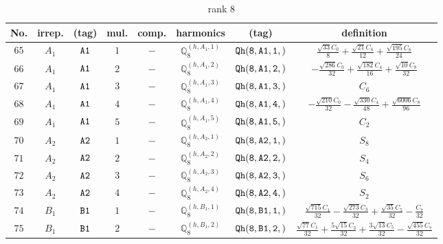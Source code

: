 \documentclass[fleqn,8pt]{jsarticle}
\begin{document}
\begin{table}[ht!]
\begin{center}
\caption{rank 8}
\renewcommand{\arraystretch}{1.3}
\begin{tabular}{cccccccc} \hline \hline
No. & irrep. & (tag) & mul. & comp. & harmonics & (tag) & definition \\ \hline
$ 65 $ & $ A_{1} $ & $ {\tt A1} $ & $ 1 $ & $ - $ & $ \mathbb{Q}_{8}^{(h,A_{1},1)} $ & $ {\tt Qh(8,A1,1,)} $ & $ \frac{\sqrt{33} C_{0}}{8} + \frac{\sqrt{21} C_{4}}{12} + \frac{\sqrt{195} C_{8}}{24} $ \\
$ 66 $ & $ A_{1} $ & $ {\tt A1} $ & $ 2 $ & $ - $ & $ \mathbb{Q}_{8}^{(h,A_{1},2)} $ & $ {\tt Qh(8,A1,2,)} $ & $ - \frac{\sqrt{286} C_{0}}{32} + \frac{\sqrt{182} C_{4}}{16} + \frac{\sqrt{10} C_{8}}{32} $ \\
$ 67 $ & $ A_{1} $ & $ {\tt A1} $ & $ 3 $ & $ - $ & $ \mathbb{Q}_{8}^{(h,A_{1},3)} $ & $ {\tt Qh(8,A1,3,)} $ & $ C_{6} $ \\
$ 68 $ & $ A_{1} $ & $ {\tt A1} $ & $ 4 $ & $ - $ & $ \mathbb{Q}_{8}^{(h,A_{1},4)} $ & $ {\tt Qh(8,A1,4,)} $ & $ - \frac{\sqrt{210} C_{0}}{32} - \frac{\sqrt{330} C_{4}}{48} + \frac{\sqrt{6006} C_{8}}{96} $ \\
$ 69 $ & $ A_{1} $ & $ {\tt A1} $ & $ 5 $ & $ - $ & $ \mathbb{Q}_{8}^{(h,A_{1},5)} $ & $ {\tt Qh(8,A1,5,)} $ & $ C_{2} $ \\
$ 70 $ & $ A_{2} $ & $ {\tt A2} $ & $ 1 $ & $ - $ & $ \mathbb{Q}_{8}^{(h,A_{2},1)} $ & $ {\tt Qh(8,A2,1,)} $ & $ S_{8} $ \\
$ 71 $ & $ A_{2} $ & $ {\tt A2} $ & $ 2 $ & $ - $ & $ \mathbb{Q}_{8}^{(h,A_{2},2)} $ & $ {\tt Qh(8,A2,2,)} $ & $ S_{4} $ \\
$ 72 $ & $ A_{2} $ & $ {\tt A2} $ & $ 3 $ & $ - $ & $ \mathbb{Q}_{8}^{(h,A_{2},3)} $ & $ {\tt Qh(8,A2,3,)} $ & $ S_{6} $ \\
$ 73 $ & $ A_{2} $ & $ {\tt A2} $ & $ 4 $ & $ - $ & $ \mathbb{Q}_{8}^{(h,A_{2},4)} $ & $ {\tt Qh(8,A2,4,)} $ & $ S_{2} $ \\
$ 74 $ & $ B_{1} $ & $ {\tt B1} $ & $ 1 $ & $ - $ & $ \mathbb{Q}_{8}^{(h,B_{1},1)} $ & $ {\tt Qh(8,B1,1,)} $ & $ \frac{\sqrt{715} C_{1}}{32} - \frac{\sqrt{273} C_{3}}{32} + \frac{\sqrt{35} C_{5}}{32} - \frac{C_{7}}{32} $ \\
$ 75 $ & $ B_{1} $ & $ {\tt B1} $ & $ 2 $ & $ - $ & $ \mathbb{Q}_{8}^{(h,B_{1},2)} $ & $ {\tt Qh(8,B1,2,)} $ & $ \frac{\sqrt{77} C_{1}}{32} + \frac{5 \sqrt{15} C_{3}}{32} + \frac{3 \sqrt{13} C_{5}}{32} - \frac{\sqrt{455} C_{7}}{32} $ \\

\end{tabular}
\end{center}
\end{table}
\end{document}
